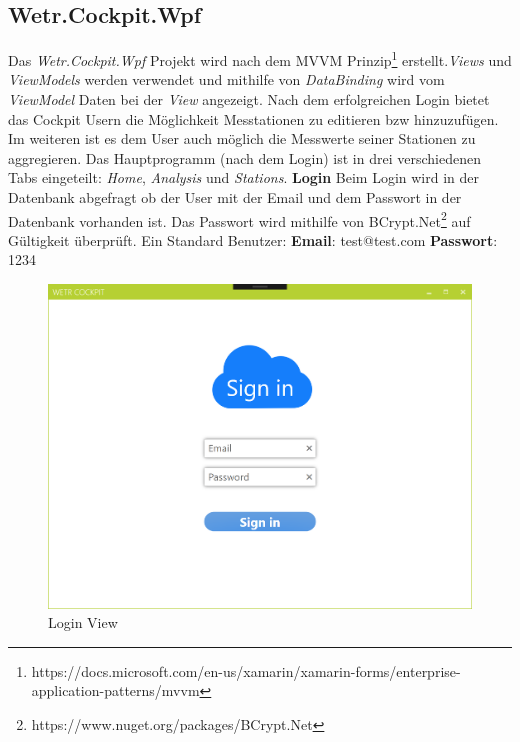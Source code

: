 \subsection{Wetr.Cockpit.Wpf}
Das \textit{Wetr.Cockpit.Wpf} Projekt wird nach dem MVVM Prinzip\footnote{https://docs.microsoft.com/en-us/xamarin/xamarin-forms/enterprise-application-patterns/mvvm} erstellt.\textit{Views} und \textit{ViewModels} werden verwendet und mithilfe von \textit{DataBinding} wird vom \textit{ViewModel} Daten bei der \textit{View} angezeigt. Nach dem erfolgreichen Login bietet das Cockpit Usern die Möglichkeit Messtationen zu editieren bzw hinzuzufügen. Im weiteren ist es dem User auch möglich die Messwerte seiner Stationen zu aggregieren.
\newline
\newline
Das Hauptprogramm (nach dem Login) ist in drei verschiedenen Tabs eingeteilt: \newline\textit{Home}, \textit{Analysis} und \textit{Stations}.
\newline
\newline
\textbf{Login}\newline
Beim Login wird in der Datenbank abgefragt ob der User mit der Email und dem Passwort in der Datenbank vorhanden ist. Das Passwort wird mithilfe von BCrypt.Net\footnote{https://www.nuget.org/packages/BCrypt.Net} auf Gültigkeit überprüft. \newline\newline
Ein Standard Benutzer:\newline
\textbf{Email}: test@test.com\newline
\textbf{Passwort}: 1234

\begin{figure}[H]
\centering
\includegraphics[width=.7\textwidth]{pictures/Cockpit/Cockpit_1.png}
\caption{Login View}
\label{fig:Wetr.Cockpit.Wpf.LoginView}
\end{figure}
\raggedright

